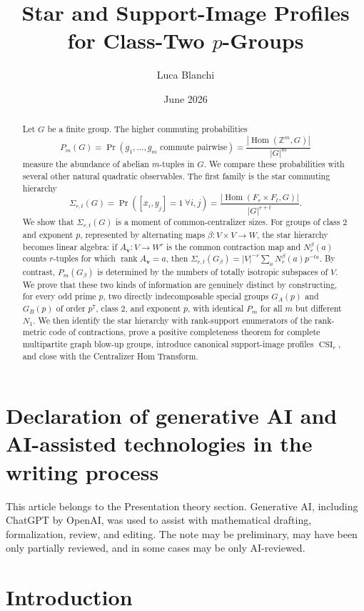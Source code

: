 \documentclass[11pt]{article}
\title{Star and Support-Image Profiles for Class-Two $p$-Groups}
\author{Luca Blanchi}
\date{June 2026}
\begin{document}
\maketitle

\begin{abstract}
Let $G$ be a finite group. The higher commuting probabilities
\[
P_m(G)=\Pr(g_1,\dots,g_m\text{ commute pairwise})=\frac{|\operatorname{Hom}(\mathbb Z^m,G)|}{|G|^m}
\]
measure the abundance of abelian $m$-tuples in $G$. We compare these probabilities with several other natural quadratic observables. The first family is the star commuting hierarchy
\[
\Sigma_{r,t}(G)=\Pr([x_i,y_j]=1\ \forall i,j)=\frac{|\operatorname{Hom}(F_r\times F_t,G)|}{|G|^{r+t}}.
\]
We show that $\Sigma_{r,t}(G)$ is a moment of common-centralizer sizes. For groups of class $2$ and exponent $p$, represented by alternating maps $\beta:V\times V\to W$, the star hierarchy becomes linear algebra: if $A_{\mathbf v}:V\to W^r$ is the common contraction map and $N_r^\beta(a)$ counts $r$-tuples for which $\operatorname{rank}A_{\mathbf v}=a$, then $\Sigma_{r,t}(G_\beta)=|V|^{-r}\sum_aN_r^\beta(a)p^{-ta}$. By contrast, $P_m(G_\beta)$ is determined by the numbers of totally isotropic subspaces of $V$. We prove that these two kinds of information are genuinely distinct by constructing, for every odd prime $p$, two directly indecomposable special groups $G_A(p)$ and $G_B(p)$ of order $p^7$, class $2$, and exponent $p$, with identical $P_m$ for all $m$ but different $N_1$. We then identify the star hierarchy with rank-support enumerators of the rank-metric code of contractions, prove a positive completeness theorem for complete multipartite graph blow-up groups, introduce canonical support-image profiles $\operatorname{CSI}_r$, and close with the Centralizer Hom Transform.
\end{abstract}

\section*{Declaration of generative AI and AI-assisted technologies in the writing process}
This article belongs to the Presentation theory section. Generative AI, including ChatGPT by \mbox{OpenAI}, was used to assist with mathematical drafting, formalization, review, and editing. The note may be preliminary, may have been only partially reviewed, and in some cases may be only AI-reviewed.

\section{Introduction}
\end{document}
